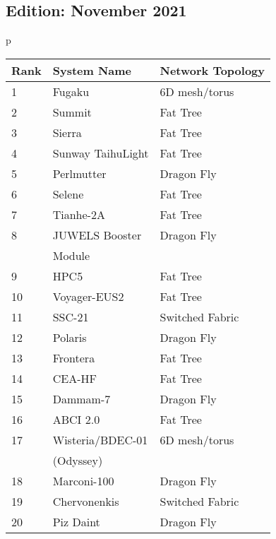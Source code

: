 \documentclass{article}
\begin{document}
\hfill
\begin{minipage}{0.45\textwidth}
\subsection{Edition: November 2021}
\label{sec:edition:-nov-2021}
\begin{tabular}{p{\textwidth}}
\begin{tabular}[H]{||l|l|l||} \hline\hline
  Rank & System Name       & Network Topology \\ \hline\hline
  1    & Fugaku            & 6D mesh/torus    \\ \hline
  2    & Summit            & Fat Tree         \\ \hline
  3    & Sierra            & Fat Tree         \\ \hline
  4    & Sunway TaihuLight & Fat Tree         \\ \hline
  5    & Perlmutter        & Dragon Fly       \\ \hline
  6    & Selene            & Fat Tree         \\ \hline
  7    & Tianhe-2A         & Fat Tree         \\ \hline
  8    & JUWELS Booster    & Dragon Fly       \\
       & Module            &                  \\ \hline
  9    & HPC5              & Fat Tree         \\ \hline
  10   & Voyager-EUS2      & Fat Tree         \\ \hline
  11   & SSC-21            & Switched Fabric  \\ \hline
  12   & Polaris           & Dragon Fly       \\ \hline
  13   & Frontera          & Fat Tree         \\ \hline
  14   & CEA-HF            & Fat Tree         \\ \hline
  15   & Dammam-7          & Dragon Fly       \\ \hline
  16   & ABCI 2.0          & Fat Tree         \\ \hline
  17   & Wisteria/BDEC-01  & 6D mesh/torus    \\ 
       & (Odyssey)         &                  \\ \hline
  18   & Marconi-100       & Dragon Fly       \\ \hline
  19   & Chervonenkis      & Switched Fabric  \\ \hline
  20   & Piz Daint         & Dragon Fly       \\ \hline\hline
\end{tabular}
\end{tabular}
\end{minipage}
\end{document}
